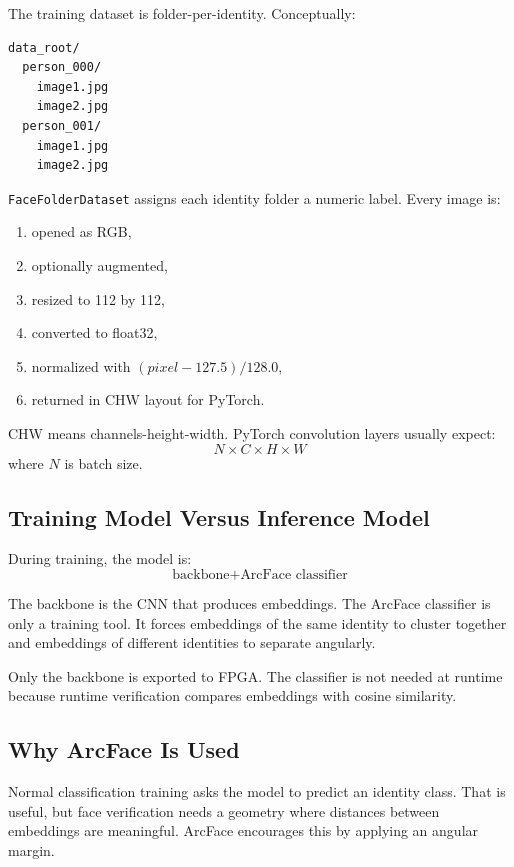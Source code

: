 \documentclass[11pt]{article}
\newcommand{\code}[1]{\texttt{#1}}
\begin{document}
The training dataset is folder-per-identity.
Conceptually:

\begin{lstlisting}
data_root/
  person_000/
    image1.jpg
    image2.jpg
  person_001/
    image1.jpg
    image2.jpg
\end{lstlisting}

\code{FaceFolderDataset} assigns each identity folder a numeric label.
Every image is:

\begin{enumerate}[leftmargin=1.6em]
  \item opened as RGB,
  \item optionally augmented,
  \item resized to 112 by 112,
  \item converted to float32,
  \item normalized with \((pixel - 127.5) / 128.0\),
  \item returned in CHW layout for PyTorch.
\end{enumerate}

CHW means channels-height-width.
PyTorch convolution layers usually expect:
\[
  N \times C \times H \times W
\]
where \(N\) is batch size.

\subsection{Training Model Versus Inference Model}

During training, the model is:
\[
  \text{backbone} + \text{ArcFace classifier}
\]

The backbone is the CNN that produces embeddings.
The ArcFace classifier is only a training tool.
It forces embeddings of the same identity to cluster together and embeddings of different identities to separate angularly.

Only the backbone is exported to FPGA.
The classifier is not needed at runtime because runtime verification compares embeddings with cosine similarity.

\subsection{Why ArcFace Is Used}

Normal classification training asks the model to predict an identity class.
That is useful, but face verification needs a geometry where distances between embeddings are meaningful.
ArcFace encourages this by applying an angular margin.
\end{document}

